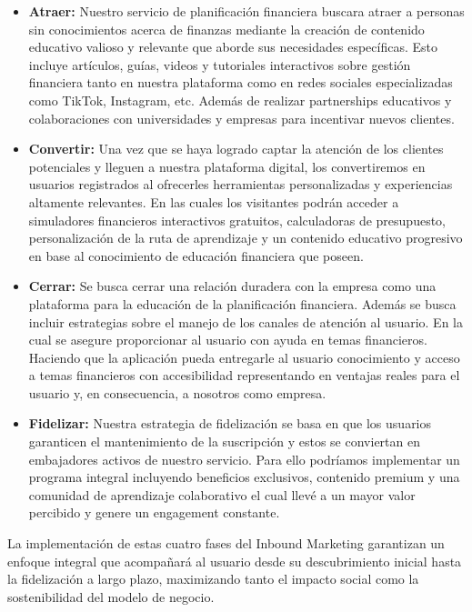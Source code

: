\begin{itemize}
	\item \textbf{Atraer:} Nuestro servicio de planificación financiera buscara atraer a personas sin conocimientos acerca de finanzas mediante la creación de contenido educativo valioso y relevante que aborde sus necesidades específicas. Esto incluye artículos, guías, videos y tutoriales interactivos sobre gestión financiera tanto en nuestra plataforma como en redes sociales especializadas como TikTok, Instagram, etc. Además de realizar partnerships educativos y colaboraciones con universidades y empresas para incentivar nuevos clientes.
	
	\item \textbf{Convertir:} Una vez que se haya logrado captar la atención de los clientes potenciales y lleguen a nuestra plataforma digital, los convertiremos en usuarios registrados al ofrecerles herramientas personalizadas y experiencias altamente relevantes. En las cuales los visitantes podrán acceder a simuladores financieros interactivos gratuitos, calculadoras de presupuesto, personalización de la ruta de aprendizaje y un contenido educativo progresivo en base al conocimiento de educación financiera que poseen.
	
	\item \textbf{Cerrar:} Se busca cerrar una relación duradera con la empresa como una plataforma para la educación de la planificación financiera. Además se busca incluir estrategias sobre el manejo de los canales de atención al usuario. En la cual se asegure proporcionar al usuario con ayuda en temas financieros. Haciendo que la aplicación pueda entregarle al usuario conocimiento y acceso a temas financieros con accesibilidad representando en ventajas reales para el usuario y, en consecuencia, a nosotros como empresa.
	
	\item \textbf{Fidelizar:} Nuestra estrategia de fidelización se basa en que los usuarios garanticen el mantenimiento de la suscripción y estos se conviertan en embajadores activos de nuestro servicio. Para ello podríamos implementar un programa integral incluyendo beneficios exclusivos, contenido premium y una comunidad de aprendizaje colaborativo el cual llevé a un mayor valor percibido y genere un engagement constante.
\end{itemize}

La implementación de estas cuatro fases del Inbound Marketing garantizan un enfoque integral que acompañará al usuario desde su descubrimiento inicial hasta la fidelización a largo plazo, maximizando tanto el impacto social como la sostenibilidad del modelo de negocio.

